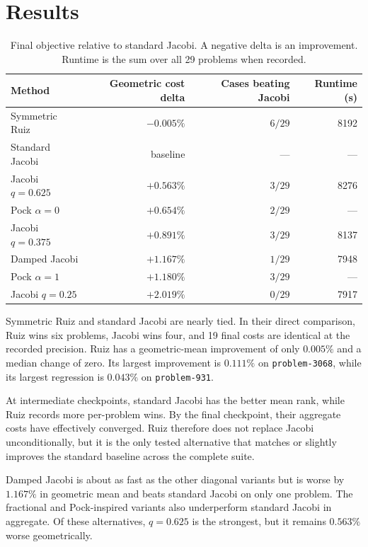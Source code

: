 \documentclass[11pt]{article}
\begin{document}
\section{Results}

\begin{table}[ht]
  \centering
  \caption{Final objective relative to standard Jacobi.  A negative delta is
  an improvement.  Runtime is the sum over all 29 problems when recorded.}
  \begin{tabular}{lrrr}
    \toprule
    Method & Geometric cost delta & Cases beating Jacobi & Runtime (s) \\
    \midrule
    Symmetric Ruiz       & $-0.005\%$ & $6/29$ & 8192 \\
    Standard Jacobi      & baseline   & ---    & ---  \\
    Jacobi $q=0.625$     & $+0.563\%$ & $3/29$ & 8276 \\
    Pock $\alpha=0$      & $+0.654\%$ & $2/29$ & ---  \\
    Jacobi $q=0.375$     & $+0.891\%$ & $3/29$ & 8137 \\
    Damped Jacobi        & $+1.167\%$ & $1/29$ & 7948 \\
    Pock $\alpha=1$      & $+1.180\%$ & $3/29$ & ---  \\
    Jacobi $q=0.25$      & $+2.019\%$ & $0/29$ & 7917 \\
    \bottomrule
  \end{tabular}
\end{table}

Symmetric Ruiz and standard Jacobi are nearly tied.  In their direct
comparison, Ruiz wins six problems, Jacobi wins four, and 19 final costs are
identical at the recorded precision.  Ruiz has a geometric-mean improvement of
only $0.005\%$ and a median change of zero.  Its largest improvement is
$0.111\%$ on \texttt{problem-3068}, while its largest regression is $0.043\%$
on \texttt{problem-931}.

At intermediate checkpoints, standard Jacobi has the better mean rank, while
Ruiz records more per-problem wins.  By the final checkpoint, their aggregate
costs have effectively converged.  Ruiz therefore does not replace Jacobi
unconditionally, but it is the only tested alternative that matches or
slightly improves the standard baseline across the complete suite.

Damped Jacobi is about as fast as the other diagonal variants but is worse by
$1.167\%$ in geometric mean and beats standard Jacobi on only one problem.
The fractional and Pock-inspired variants also underperform standard Jacobi in
aggregate.  Of these alternatives, $q=0.625$ is the strongest, but it remains
$0.563\%$ worse geometrically.
\end{document}
